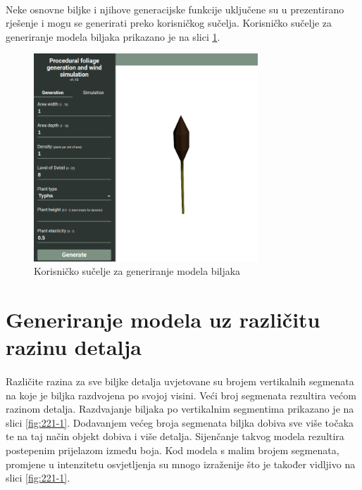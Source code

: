 \documentclass[times, utf8, diplomski]{fer}
\begin{document}
\paragraph{}
Neke osnovne biljke i njihove generacijske funkcije uključene su u prezentirano rješenje i 
mogu se generirati preko korisničkog sučelja. Korisničko sučelje za generiranje modela 
biljaka prikazano je na slici \ref{fig:22-4}.

\begin{figure}[h]
	\centering
	\includegraphics[width=0.75\textwidth]{img/22-4}
	\caption{Korisničko sučelje za generiranje modela biljaka}
	\label{fig:22-4}
\end{figure}

\section{Generiranje modela uz različitu razinu detalja}
\paragraph{}
Različite razina za sve biljke detalja uvjetovane su brojem vertikalnih segmenata na koje je 
biljka razdvojena po svojoj visini. Veći broj segmenata rezultira većom razinom detalja. 
Razdvajanje biljaka po vertikalnim segmentima prikazano je na slici \ref{fig:221-1}. 
Dodavanjem većeg broja segmenata biljka dobiva sve više točaka te na taj način objekt dobiva 
i više detalja. Sijenčanje takvog modela rezultira postepenim prijelazom između boja. Kod 
modela s malim brojem segmenata, promjene u intenzitetu osvjetljenja su mnogo izraženije što 
je također vidljivo na slici \ref{fig:221-1}.
\end{document}
